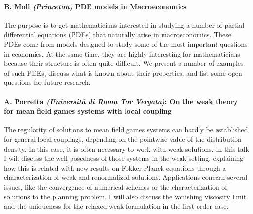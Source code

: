 \documentclass[11pt]{article}
\begin{document}
\paragraph{B. Moll {\sl(Princeton)}   PDE models in Macroeconomics }
The purpose  is to get mathematicians
interested in studying a number of partial
differential equations (PDEs) that naturally arise
in macroeconomics. These PDEs come from models
designed to study some of the most important
questions in economics. At the same time, they are
highly interesting for mathematicians because their
structure is often quite difficult. We present a number
of examples of such PDEs, discuss what is known
about their properties, and list some open questions
for future research.

\paragraph{ A. Porretta {\sl (Universit{\`a} di Roma Tor Vergata)}: On the weak theory for mean field games systems with local coupling }
The regularity of solutions to mean field games systems can hardly be established for general local 
couplings, depending on the pointwise value of the distribution density. In this case,  it is often 
necessary to work with weak solutions. In this talk I will discuss the well-posedness of those systems in 
the weak setting, explaining how this is related with new results on Fokker-Planck equations through a 
characterization of weak and renormalized solutions. Applications concern several issues, like the 
convergence of numerical schemes or the characterization of solutions to the planning problem.  I will 
also discuss the vanishing viscosity limit and the uniqueness for the relaxed weak formulation in the first 
order case.
\end{document}
